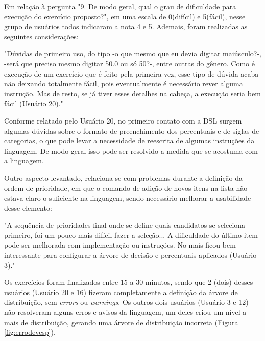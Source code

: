 Em relação à pergunta "9. De modo geral, qual o grau de dificuldade para execução do exercício proposto?", em uma escala de 0(difícil) e 5(fácil), nesse grupo de usuários todos indicaram a nota 4 e 5. Ademais, foram realizadas as seguintes considerações:

 \begin{citacao}
 "Dúvidas de primeiro uso, do tipo -o que  mesmo que eu devia digitar maiúsculo?-, -será que preciso mesmo digitar 50.0 ou só 50?-,  entre outras do gênero. Como é execução de um exercício que é feito pela primeira vez, esse tipo de dúvida acaba não deixando totalmente fácil, pois eventualmente é necessário rever alguma instrução. Mas de resto, se já tiver esses detalhes na cabeça, a execução seria bem fácil (Usuário 20)."
\end{citacao}

Conforme relatado pelo Usuário 20, no primeiro contato com a DSL surgem algumas dúvidas sobre o formato de preenchimento dos percentuais e de siglas de categorias, o que pode levar a necessidade de reescrita de algumas instruções da linguagem. De modo geral isso pode ser resolvido a medida que se acostuma com a linguagem.

Outro aspecto levantado, relaciona-se com problemas durante a definição da ordem de prioridade, em que o comando de adição de novos itens na lista não estava claro o suficiente na linguagem, sendo necessário melhorar a usabilidade desse elemento:

\begin{citacao}
"A sequência de prioridades final onde se define quais candidatos se seleciona primeiro, foi um pouco mais difícil fazer a seleção... A dificuldade do último item pode ser melhorada com implementação ou instruções. No mais ficou bem interessante para configurar a árvore de decisão e percentuais aplicados (Usuário 3)." 
\end{citacao}

Os exercícios foram finalizados entre 15 a 30 minutos, sendo que 2 (dois) desses usuários (Usuário 20 e 16) fizeram completamente a definição da árvore de distribuição, sem \textit{errors} ou \textit{warnings}. Os outros dois usuários (Usuário 3 e 12) não resolveram alguns erros e avisos da linguagem, um deles criou um nível a mais de distribuição, gerando uma árvore de distribuição incorreta (Figura \ref{fig:errodevesp}). 



\newpage


